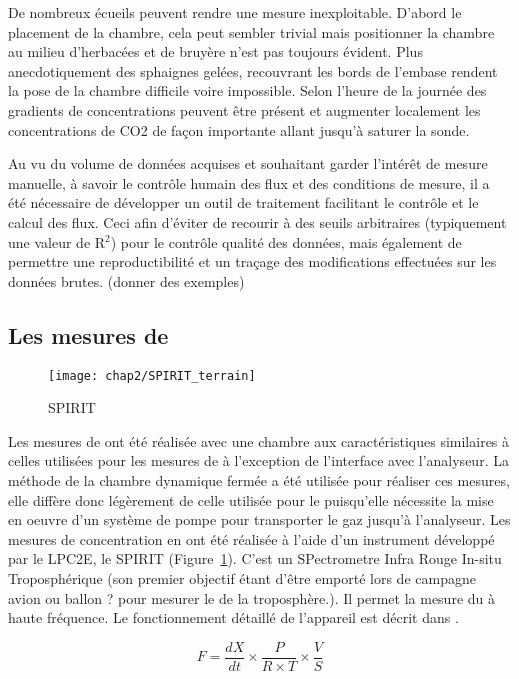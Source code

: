 De nombreux écueils peuvent rendre une mesure inexploitable. D'abord le placement de la chambre, cela peut sembler trivial mais positionner la chambre au milieu d'herbacées et de bruyère n'est pas toujours évident. Plus anecdotiquement des sphaignes gelées, recouvrant les bords de l'embase rendent la pose de la chambre difficile voire impossible. Selon l'heure de la journée des gradients de concentrations peuvent être présent et augmenter localement les concentrations de CO2 de façon importante allant jusqu'à saturer la sonde.

Au vu du volume de données acquises et souhaitant garder l'intérêt de mesure manuelle, à savoir le contrôle humain des flux et des conditions de mesure, il a été nécessaire de développer un outil de traitement facilitant le contrôle et le calcul des flux.
Ceci afin d'éviter de recourir à des seuils arbitraires (typiquement une valeur de R$^{2}$) pour le contrôle qualité des données, mais également de permettre une reproductibilité et un traçage des modifications effectuées sur les données brutes.
(donner des exemples)

\subsection{Les mesures de \chh}

\begin{figure}
\texttt{[image: chap2/SPIRIT\_terrain]}
\caption{SPIRIT}
\label{fig:SPIRIT}
\end{figure}

Les mesures de \chh ont été réalisée avec une chambre aux caractéristiques similaires à celles utilisées pour les mesures de \coo à l'exception de l'interface avec l'analyseur.
La méthode de la chambre dynamique fermée a été utilisée pour réaliser ces mesures, elle diffère donc légèrement de celle utilisée pour le \coo puisqu'elle nécessite la mise en oeuvre d'un système de pompe pour transporter le gaz jusqu'à l'analyseur.
Les mesures de concentration en \chh ont été réalisée à l'aide d'un instrument développé par le LPC2E, le SPIRIT (Figure~\ref{fig:SPIRIT}).
C'est un SPectrometre Infra Rouge In-situ Troposphérique (son premier objectif étant d'être emporté lors de campagne avion ou ballon ? pour mesurer le \chh de la troposphère.).
Il permet la mesure du \chh à haute fréquence.
Le fonctionnement détaillé de l'appareil est décrit dans \cite{guimbaud2011}.

\begin{equation}
F = \frac{dX}{dt} \times \frac{P}{R \times T} \times \frac{V}{S}
\end{equation}

